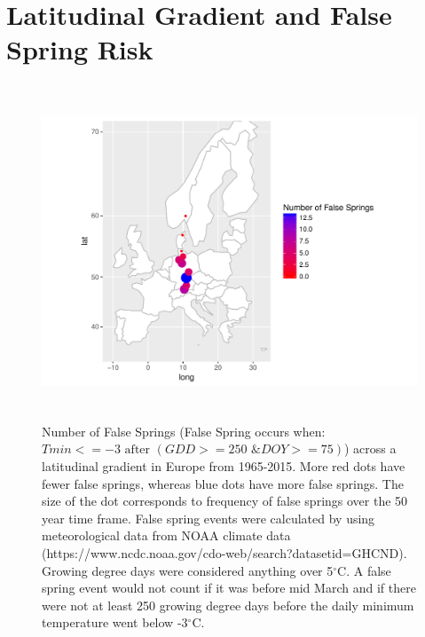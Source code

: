 \documentclass{article}\usepackage[]{graphicx}\usepackage[]{color}
\begin{document}
\renewcommand{\thetable}{\arabic{table}}
\renewcommand{\thefigure}{\arabic{figure}}
\renewcommand{\labelitemi}{$-$}

\section*{Latitudinal Gradient and False Spring Risk}

\begin{figure} [H]
\begin{center}
\caption{Number of False Springs (False Spring occurs when: \(Tmin <=-3 \text{ after } (GDD>=250 \text{ \& } DOY>=75) \)) across a latitudinal gradient in Europe from 1965-2015. More red dots have fewer false springs, whereas blue dots have more false springs. The size of the dot corresponds to frequency of false springs over the 50 year time frame. False spring events were calculated by using meteorological data from NOAA climate data (https://www.ncdc.noaa.gov/cdo-web/search?datasetid=GHCND). Growing degree days were considered anything over 5$^{\circ}$C. A false spring event would not count if it was before mid March \citep{Augspurger2013} and if there were not at least 250 growing degree days before the daily minimum temperature went below -3$^{\circ}$C.}
\includegraphics[width=18cm, height=10cm]{..//figure/FSI_eurmap.pdf} %
\end{center}
\end{figure}
\end{document}
